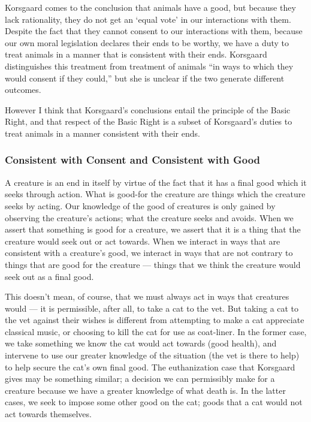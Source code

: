 \documentclass[12pt]{article}
\begin{document}
		Korsgaard comes to the conclusion that animals have a good, but because
		they lack rationality, they do not get an ‘equal vote’ in our
		interactions with them.\autocite[12.2.1]{kors} Despite the fact that
		they cannot consent to our interactions with them, because our own
		moral legislation declares their ends to be worthy, we have a duty to
		treat animals in a manner that is consistent with their
		ends.\autocite[12.2.1]{kors} Korsgaard distinguishes this treatment
		from treatment of animals “in ways to which they would consent if they
		could,” but she is unclear if the two generate different
		outcomes.\autocite[12.2.1]{kors}

		However I think that Korsgaard’s conclusions entail the principle of
		the Basic Right, and that respect of the Basic Right is a subset of
		Korsgaard’s duties to treat animals in a manner consistent with their
		ends.

		\subsubsection{Consistent with Consent and Consistent with Good}

			A creature is an end in itself by virtue of the fact that it has a
			final good which it seeks through action.  What is good-for the
			creature are things which the creature seeks by acting.  Our
			knowledge of the good of creatures is only gained by observing the
			creature’s actions; what the creature seeks and avoids.  When we
			assert that something is good for a creature, we assert that it is
			a thing that the creature would seek out or act towards.  When we
			interact in ways that are consistent with a creature’s good, we
			interact in ways that are not contrary to things that are good for
			the creature --- things that we think the creature would seek out
			as a final good.

			This doesn’t mean, of course, that we must always act in ways that
			creatures would --- it is permissible, after all, to take a cat to
			the vet.  But taking a cat to the vet against their wishes is
			different from attempting to make a cat appreciate classical music,
			or choosing to kill the cat for use as coat-liner.  In the former
			case, we take something we know the cat would act towards (good
			health), and intervene to use our greater knowledge of the
			situation (the vet is there to help) to help secure the cat’s own
			final good.  The euthanization case that Korsgaard gives may be
			something similar; a decision we can permissibly make for a
			creature because we have a greater knowledge of what death
			is.\autocite[12.2.1]{kors} In the latter cases, we seek to impose
			some other good on the cat; goods that a cat would not act towards
			themselves.
\end{document}
